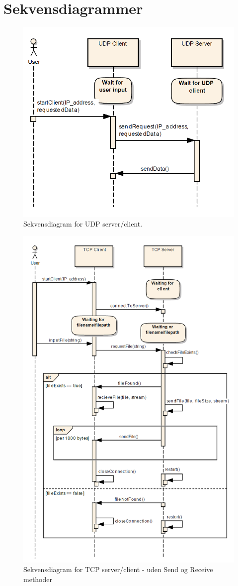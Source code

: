 \section{Sekvensdiagrammer}

\begin{figure}[h]
	\centering
	\includegraphics[width=0.6\linewidth]{figs/sequence2.png}
	\caption{Sekvensdiagram for UDP server/client.}
	\label{fig:sequence2}
\end{figure}

\begin{figure}[h]
	\centering
	\includegraphics[width=0.8\linewidth]{figs/sequence1.png}
	\caption{Sekvensdiagram for TCP server/client - uden Send og Receive methoder}
	\label{fig:sequence1}
\end{figure}